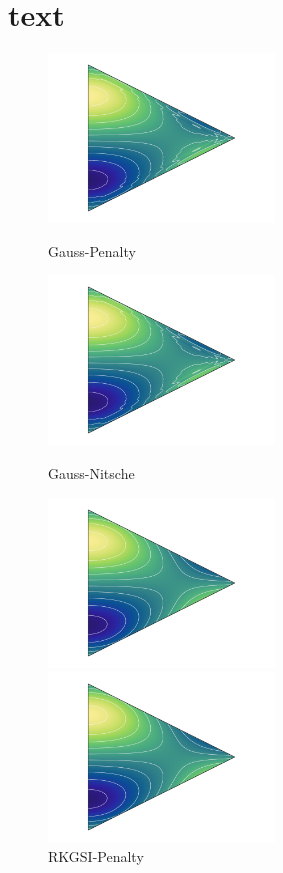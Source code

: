 \chapter{text}
\begin{figure}[H]
\centering
\begin{minipage}[t]{0.48\textwidth}
    \centering
    \includegraphics[width=6cm]{figure/Mxy/Gauss-Penalty.png}
\caption*{Gauss-Penalty}
\end{minipage}
\begin{minipage}[t]{0.48\textwidth}
    \centering
    \includegraphics[width=6cm]{figure/Mxy/Gauss-Nitsche.png}
    \caption*{Gauss-Nitsche}
\end{minipage}
\begin{minipage}[t]{0.48\textwidth}
    \centering
        \includegraphics[width=6cm]{figure/Mxy/RKGSI-Penalty.png}
    \caption*{RKGSI-Penalty}
\end{minipage}
\begin{minipage}[t]{0.48\textwidth}
    \centering
        \includegraphics[width=6cm]{figure/Mxy/RKGSI-Nitsche.png}

\end{minipage}
\end{figure}
